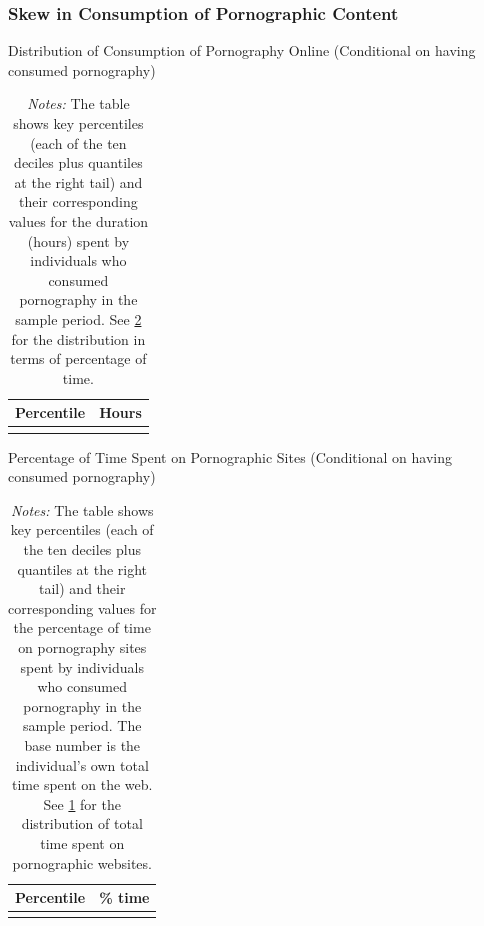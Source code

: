 \documentclass[12pt,twoside]{article}
\begin{document}
\FloatBarrier
\subsubsection{Skew in Consumption of Pornographic Content}
\begin{table}[ht] \centering \small \setlength\tabcolsep{10 pt}
	\caption{Distribution of Consumption of Pornography Online (Conditional on having consumed pornography)}
	\label{tab:distribution_duration}
	\begin{adjustbox}{max width=\textwidth}
		\begin{tabular}{cr}
			\toprule
			\multicolumn{1}{c}{\textbf{Percentile}}&\multicolumn{1}{c}{\textbf{Hours}}\\
			\midrule
			\\
			\bottomrule
		\end{tabular}
	\end{adjustbox}
	\caption*{\footnotesize \emph{Notes:} 
		The table shows key percentiles (each of the ten deciles plus quantiles at the right tail) and their corresponding values for the duration (hours) spent by individuals who consumed pornography in the sample period. 
		See \cref{tab:distribution_prop_duration} for the distribution in terms of percentage of time.
	}
\end{table}

\begin{table}[ht] \centering \small \setlength\tabcolsep{10 pt}
	\caption{Percentage of Time Spent on Pornographic Sites (Conditional on having consumed pornography)}
	\label{tab:distribution_prop_duration}
	\begin{adjustbox}{max width=\textwidth}
		\begin{tabular}{cr}
			\toprule
			\multicolumn{1}{c}{\textbf{Percentile}}&\multicolumn{1}{c}{\textbf{\% time}}\\
			\midrule
			\\
			\bottomrule
		\end{tabular}
	\end{adjustbox}
	\caption*{\footnotesize \emph{Notes:} The table shows key percentiles (each of the ten deciles plus quantiles at the right tail) and their corresponding values for the percentage of time on pornography sites spent by individuals who consumed pornography in the sample period. The base number is the individual's own total time spent on the web. See \cref{tab:distribution_duration} for the distribution of total time spent on pornographic websites.}
\end{table}
\end{document}
